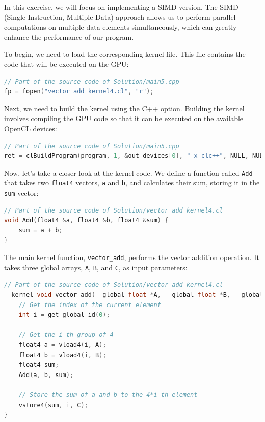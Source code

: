 \documentclass{article}
\begin{document}
In this exercise, we will focus on implementing a SIMD version. The SIMD (Single Instruction, Multiple Data) approach allows us to perform parallel computations on multiple data elements simultaneously, which can greatly enhance the performance of our program.

To begin, we need to load the corresponding kernel file. This file contains the code that will be executed on the GPU:

\begin{lstlisting}[language=C++, numbers=none]
// Part of the source code of Solution/main5.cpp
fp = fopen("vector_add_kernel4.cl", "r");
\end{lstlisting}

Next, we need to build the kernel using the C++ option. Building the kernel involves compiling the GPU code so that it can be executed on the available OpenCL devices:

\begin{lstlisting}[language=C++, numbers=none]
// Part of the source code of Solution/main5.cpp
ret = clBuildProgram(program, 1, &out_devices[0], "-x clc++", NULL, NULL);
\end{lstlisting}

Now, let's take a closer look at the kernel code. We define a function called \texttt{Add} that takes two \texttt{float4} vectors, \texttt{a} and \texttt{b}, and calculates their sum, storing it in the \texttt{sum} vector:

\begin{lstlisting}[language=C++, numbers=none]
// Part of the source code of Solution/vector_add_kernel4.cl
void Add(float4 &a, float4 &b, float4 &sum) {
    sum = a + b;
}
\end{lstlisting}

The main kernel function, \texttt{vector\_add}, performs the vector addition operation. It takes three global arrays, \texttt{A}, \texttt{B}, and \texttt{C}, as input parameters:

\begin{lstlisting}[language=C++, numbers=none]
// Part of the source code of Solution/vector_add_kernel4.cl
__kernel void vector_add(__global float *A, __global float *B, __global float *C) {
    // Get the index of the current element
    int i = get_global_id(0);
    
    // Get the i-th group of 4
    float4 a = vload4(i, A);
    float4 b = vload4(i, B);
    float4 sum;
    Add(a, b, sum);
    
    // Store the sum of a and b to the 4*i-th element
    vstore4(sum, i, C);
}
\end{lstlisting}
\end{document}

